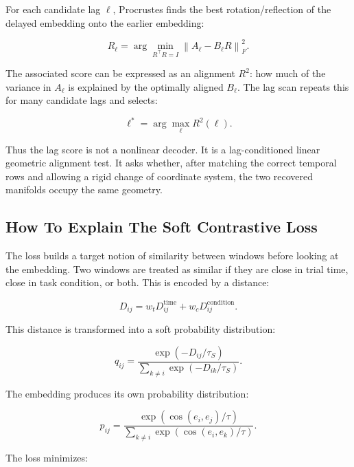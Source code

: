 \documentclass[11pt]{article}
\begin{document}
For each candidate lag $\ell$, Procrustes finds the best rotation/reflection
of the delayed embedding onto the earlier embedding:

\begin{equation}
R_\ell
=
\arg\min_{R^\top R=I}
\left\|
A_\ell - B_\ell R
\right\|_F^2.
\end{equation}

The associated score can be expressed as an alignment $R^2$: how much of the
variance in $A_\ell$ is explained by the optimally aligned $B_\ell$. The lag
scan repeats this for many candidate lags and selects:

\begin{equation}
\ell^\ast =
\arg\max_\ell R^2(\ell).
\end{equation}

Thus the lag score is not a nonlinear decoder. It is a lag-conditioned linear
geometric alignment test. It asks whether, after matching the correct temporal
rows and allowing a rigid change of coordinate system, the two recovered
manifolds occupy the same geometry.

\subsection{How To Explain The Soft Contrastive Loss}

The loss builds a target notion of similarity between windows before looking
at the embedding. Two windows are treated as similar if they are close in trial
time, close in task condition, or both. This is encoded by a distance:

\begin{equation}
D_{ij}
=
w_t D^{\text{time}}_{ij}
+
w_c D^{\text{condition}}_{ij}.
\end{equation}

This distance is transformed into a soft probability distribution:

\begin{equation}
q_{ij}
=
\frac{\exp(-D_{ij}/\tau_S)}
{\sum_{k\ne i}\exp(-D_{ik}/\tau_S)}.
\end{equation}

The embedding produces its own probability distribution:

\begin{equation}
p_{ij}
=
\frac{\exp(\operatorname{cos}(e_i,e_j)/\tau)}
{\sum_{k\ne i}\exp(\operatorname{cos}(e_i,e_k)/\tau)}.
\end{equation}

The loss minimizes:
\end{document}
